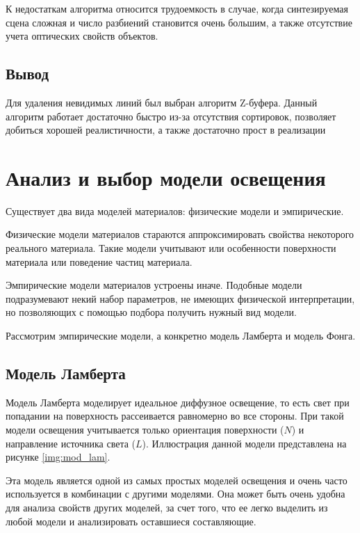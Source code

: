 К недостаткам алгоритма относится трудоемкость в случае, когда синтезируемая сцена сложная и число разбиений становится очень большим, а также отсутствие учета оптических свойств объектов.
 
 
\subsection*{Вывод}
Для удаления невидимых линий был выбран алгоритм Z-буфера. Данный алгоритм работает достаточно быстро из-за отсутствия сортировок, позволяет добиться хорошей реалистичности, а также достаточно прост в реализации


\section{Анализ и выбор модели освещения}

Существует два вида моделей материалов: физические модели и эмпирические. 

Физические модели материалов стараются аппроксимировать свойства некоторого реального материала. Такие модели учитывают или особенности поверхности материала или поведение частиц материала.

Эмпирические модели материалов устроены иначе. Подобные модели подразумевают некий набор параметров, не имеющих физической интерпретации, но позволяющих с помощью подбора получить нужный вид модели.

Рассмотрим эмпирические модели, а конкретно модель Ламберта и модель Фонга.

\subsection{Модель Ламберта}

Модель Ламберта \cite{lamber_fong} моделирует идеальное диффузное освещение, то есть свет при попадании на поверхность рассеивается равномерно во все стороны. При такой модели освещения учитывается только ориентация поверхности ($N$) и направление источника света ($L$). Иллюстрация данной модели представлена на рисунке \ref{img:mod_lam}.


Эта модель является одной из самых простых моделей освещения и очень часто используется в комбинации с другими моделями. Она может быть очень удобна для анализа свойств других моделей, за счет того, что ее легко выделить из любой модели и анализировать оставшиеся составляющие.

